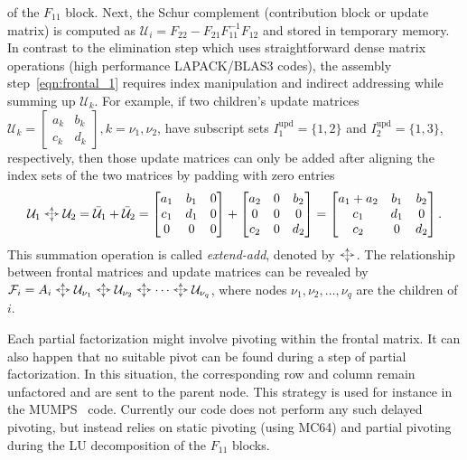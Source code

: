 \documentclass{article}
\newcommand{\extadd}{\mathbin{\hspace{0.65em}\text{\makebox[0pt]{\resizebox{0.3em}{0.85em}{\(\updownarrow\)}}\raisebox{0.15em}{\makebox[0pt]{\resizebox{1.3em}{0.2em}{\(\leftrightarrow\)}}}}\hspace{0.65em}}}
\begin{document}
of the $F_{11}$ block.
Next, the Schur complement (contribution block or update matrix) is
computed as $\mathcal{U}_i= F_{22}-F_{21} F_{11}^{-1} F_{12}$ and
stored in temporary memory.
In contrast to the elimination step which uses straightforward dense
matrix operations (high performance LAPACK/BLAS3 codes), the assembly
step~\eqref{eqn:frontal_1} requires index manipulation and indirect
addressing while summing up $\mathcal{U}_k$. For example, if two
children's update matrices $\mathcal{U}_k = \begin{bmatrix} a_k & b_k
  \\ c_k & d_k \end{bmatrix}, k=\nu_1,\nu_2$, have subscript sets
$I^{\mathrm{upd}}_1=\{1,2\}$ and $I^{\mathrm{upd}}_2=\{1,3\}$,
respectively, then those update matrices can only be added after
aligning the index sets of the two matrices by padding with zero
entries
\begin{equation} \label{eqn:extend-add}
  \mathcal{U}_1 \extadd \mathcal{U}_2 = \bar{\mathcal{U}}_1 + \bar{\mathcal{U}}_2 = 
  \begin{bmatrix}
    a_{1} & b_{1} & 0\\
    c_{1} & d_{1} & 0\\
    0 & 0 & 0
  \end{bmatrix} +
  \begin{bmatrix}
    a_{2} & 0 & b_{2}\\
    0 & 0 & 0\\
    c_{2} & 0 & d_{2}
  \end{bmatrix} =
  \begin{bmatrix}
    a_{1}+a_{2} & b_{1} & b_{2}\\
    c_{1} & d_{1} & 0\\
    c_{2} & 0 & d_{2}\end{bmatrix}.
\end{equation}
This summation operation is called \textit{extend-add}, denoted by
$\extadd$. The relationship between frontal matrices and update
matrices can be revealed by $\mathcal{F}_{i} = A_{i} \extadd
\mathcal{U}_{\nu_1} \extadd \mathcal{U}_{\nu_2} \extadd \cdots \extadd
\mathcal{U}_{\nu_q}$, where nodes $\nu_{1},\nu_{2},\ldots,\nu_{q}$ are
the children of $i$.

Each partial factorization might involve pivoting within the frontal
matrix. It can also happen that no suitable pivot can be found during
a step of partial factorization. In this situation, the corresponding
row and column remain unfactored and are sent to the parent node. This
strategy is used for instance in the MUMPS~\cite{amestoy2001fully}
code. Currently our code does not perform any such delayed pivoting,
but instead relies on static pivoting (using MC64) and partial
pivoting during the LU decomposition of the $F_{11}$ blocks.
\end{document}
